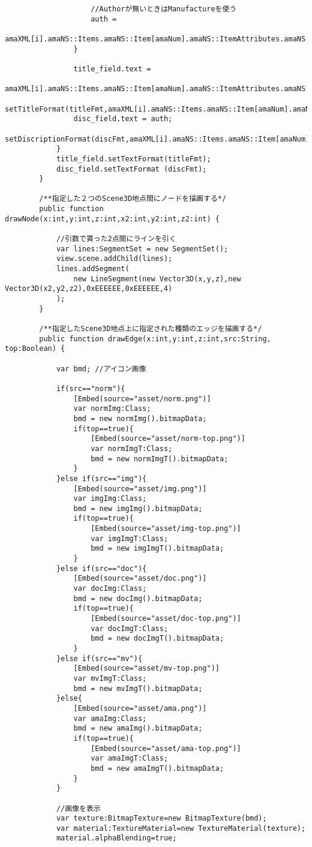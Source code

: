 {\begin{verbatim}
					//Authorが無いときはManufactureを使う
					auth = 
					amaXML[i].amaNS::Items.amaNS::Item[amaNum].amaNS::ItemAttributes.amaNS::Manufacturer[0].toString();
				}
				
				title_field.text =
				amaXML[i].amaNS::Items.amaNS::Item[amaNum].amaNS::ItemAttributes.amaNS::Title.toString();
				setTitleFormat(titleFmt,amaXML[i].amaNS::Items.amaNS::Item[amaNum].amaNS::DetailPageURL);
				disc_field.text = auth;
				setDiscriptionFormat(discFmt,amaXML[i].amaNS::Items.amaNS::Item[amaNum].amaNS::DetailPageURL);
			}
			title_field.setTextFormat(titleFmt);
			disc_field.setTextFormat (discFmt);
		}

		/**指定した２つのScene3D地点間にノードを描画する*/
		public function drawNode(x:int,y:int,z:int,x2:int,y2:int,z2:int) {
			
			//引数で貰った2点間にラインを引く
			var lines:SegmentSet = new SegmentSet();
			view.scene.addChild(lines);
			lines.addSegment(
				new LineSegment(new Vector3D(x,y,z),new Vector3D(x2,y2,z2),0xEEEEEE,0xEEEEEE,4)
			);
		}

		/**指定したScene3D地点上に指定された種類のエッジを描画する*/
		public function drawEdge(x:int,y:int,z:int,src:String, top:Boolean) {
			
			var bmd; //アイコン画像
			
			if(src=="norm"){
				[Embed(source="asset/norm.png")]
				var normImg:Class;
				bmd = new normImg().bitmapData;
				if(top==true){
					[Embed(source="asset/norm-top.png")]
					var normImgT:Class;
					bmd = new normImgT().bitmapData;
				}
			}else if(src=="img"){
				[Embed(source="asset/img.png")]
				var imgImg:Class;
				bmd = new imgImg().bitmapData;
				if(top==true){
					[Embed(source="asset/img-top.png")]
					var imgImgT:Class;
					bmd = new imgImgT().bitmapData;
				}
			}else if(src=="doc"){
				[Embed(source="asset/doc.png")]
				var docImg:Class;
				bmd = new docImg().bitmapData;
				if(top==true){
					[Embed(source="asset/doc-top.png")]
					var docImgT:Class;
					bmd = new docImgT().bitmapData;
				}
			}else if(src=="mv"){
				[Embed(source="asset/mv-top.png")]
				var mvImgT:Class;
				bmd = new mvImgT().bitmapData;
			}else{
				[Embed(source="asset/ama.png")]
				var amaImg:Class;
				bmd = new amaImg().bitmapData;
				if(top==true){
					[Embed(source="asset/ama-top.png")]
					var amaImgT:Class;
					bmd = new amaImgT().bitmapData;
				}
			}
					
			//画像を表示
			var texture:BitmapTexture=new BitmapTexture(bmd);
			var material:TextureMaterial=new TextureMaterial(texture);
			material.alphaBlending=true;
				

\end{verbatim}}
